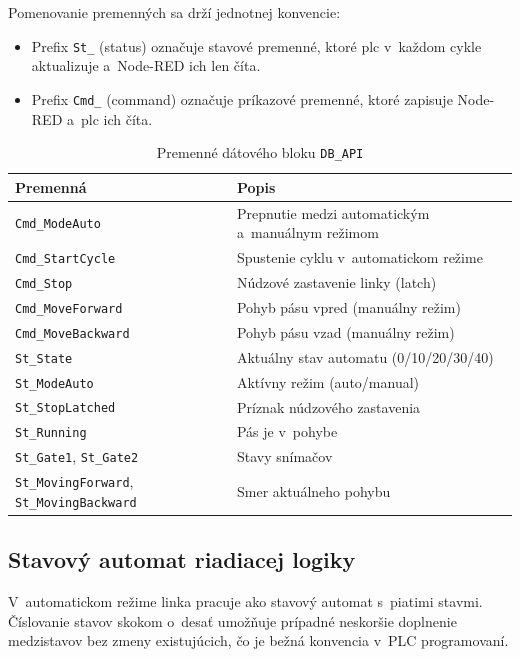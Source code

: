 Pomenovanie premenných sa drží jednotnej konvencie:
\begin{itemize}
      \item Prefix \texttt{St\_} (status) označuje stavové premenné, ktoré
            \acrshort{plc} v~každom cykle aktualizuje a~Node-RED ich len
            číta.
      \item Prefix \texttt{Cmd\_} (command) označuje príkazové premenné,
            ktoré zapisuje Node-RED a~\acrshort{plc} ich číta.
\end{itemize}

\begin{table}[H]
\centering
\caption{Premenné dátového bloku \texttt{DB\_API}}
\label{tab:db_api}
\begin{tabular}{|l|p{8cm}|}
\hline
\textbf{Premenná} & \textbf{Popis} \\
\hline
\texttt{Cmd\_ModeAuto}     & Prepnutie medzi automatickým a~manuálnym režimom \\
\texttt{Cmd\_StartCycle}   & Spustenie cyklu v~automatickom režime \\
\texttt{Cmd\_Stop}         & Núdzové zastavenie linky (latch) \\
\texttt{Cmd\_MoveForward}  & Pohyb pásu vpred (manuálny režim) \\
\texttt{Cmd\_MoveBackward} & Pohyb pásu vzad (manuálny režim) \\
\hline
\texttt{St\_State}         & Aktuálny stav automatu (0/10/20/30/40) \\
\texttt{St\_ModeAuto}      & Aktívny režim (auto/manual) \\
\texttt{St\_StopLatched}   & Príznak núdzového zastavenia \\
\texttt{St\_Running}       & Pás je v~pohybe \\
\texttt{St\_Gate1}, \texttt{St\_Gate2} & Stavy snímačov \\
\texttt{St\_MovingForward}, \texttt{St\_MovingBackward} & Smer aktuálneho pohybu \\
\hline
\end{tabular}
\end{table}


\subsection{Stavový automat riadiacej logiky}

V~automatickom režime linka pracuje ako stavový automat s~piatimi stavmi.
Číslovanie stavov skokom o~desať umožňuje prípadné neskoršie doplnenie
medzistavov bez zmeny existujúcich, čo je bežná konvencia
v~PLC programovaní.

